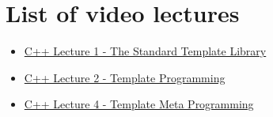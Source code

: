 \documentclass[11pt,fleqn]{book} %
\begin{document}

\chapter*{List of video lectures}


\begin{itemize}
\item \href{https://www.youtube.com/watch?v=asGZTCR53KY&list=PL7vEgTL3FalY2eBxud1wsfz8OKvE9sd_z}{C++ Lecture 1 - The Standard Template Library}
\item \href{https://www.youtube.com/watch?v=iU3wsiJ5mts}{C++ Lecture 2 - Template Programming }
\item \href{https://www.youtube.com/watch?v=6PWUByLZO0g}{C++ Lecture 4 - Template Meta Programming}
\end{itemize}
\end{document}
